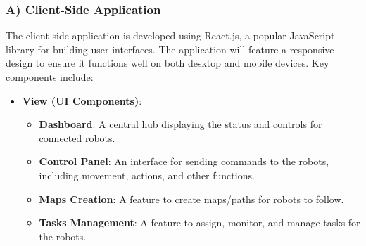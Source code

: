 \subsubsection{A) Client-Side Application}
\vspace{-2.5mm}
The client-side application is developed using React.js, a popular JavaScript library for building user interfaces. The application will feature a responsive design to ensure it functions well on both desktop and mobile devices. Key components include:
\vspace{-1mm}
\begin{itemize}
    \item \textbf{View (UI Components)}:
    \begin{itemize}
    \vspace{-1mm}
        \item \textbf{Dashboard}: A central hub displaying the status and controls for connected robots.
        \vspace{-1mm}
        \item \textbf{Control Panel}: An interface for sending commands to the robots, including movement, actions, and other functions.
        \vspace{-1mm}
        \item \textbf{Maps Creation}: A feature to create maps/paths for robots to follow.
        \vspace{-1mm}
        \item \textbf{Tasks Management}: A feature to assign, monitor, and manage tasks for the robots.
    \end{itemize}
\end{itemize}
\vspace{-3mm}
